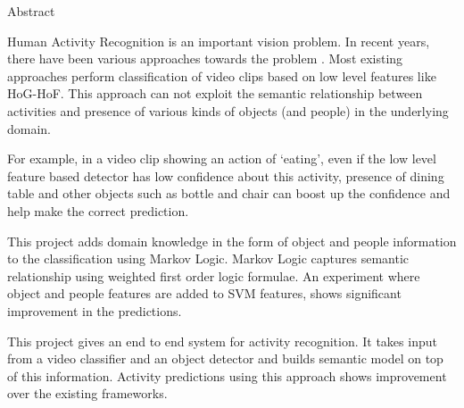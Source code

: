 \begin{center}
\LARGE{Abstract}
\end{center}

\vspace{0.5in}

Human Activity Recognition is an important vision problem.
In recent years, there have been various approaches towards the problem
\cite{actionsInContext,Realistic,improving,Parking}.
Most existing approaches perform classification of video clips 
based on low level features like HoG-HoF. 
This approach can not exploit the semantic relationship between activities 
and presence of various kinds of objects (and people) in the underlying domain.

\begin{comment}
They don't consider the semantic information about the domain while classification.
This methodology is not able to capture semantic relationship between activities and underlying domain.
\end{comment}

For example, in a video clip showing an action of `eating', even if the low level 
feature based detector has low confidence about this activity, presence of dining table 
and other objects such as bottle and chair can boost up the confidence and help make the correct prediction.

\begin{comment}
For example, in a video clip showing an action of `eating', even if low level
feature based detector has low confidence about presence of diningtable, 
high level features such as bottle and chair object features can enhance the 
confidence of object dining table being present.

For example, presence of two persons in a clip increases chances of activity `conversation',
a partial occlusion in the scene will lead to different low level features.
Thus low level features may not be able to capture the information conveyed by 
the presence of two persons effectively.
\end{comment}

This project adds domain knowledge in the form of object and people information
to the classification using Markov Logic. Markov Logic captures semantic relationship
using weighted first order logic formulae. An experiment where object and people features are 
added to SVM features, shows significant improvement in the predictions.

This project gives an end to end system for activity recognition. It takes input from 
a video classifier and an object detector and builds semantic model on top of this information.
Activity predictions using this approach shows improvement over the existing frameworks.
